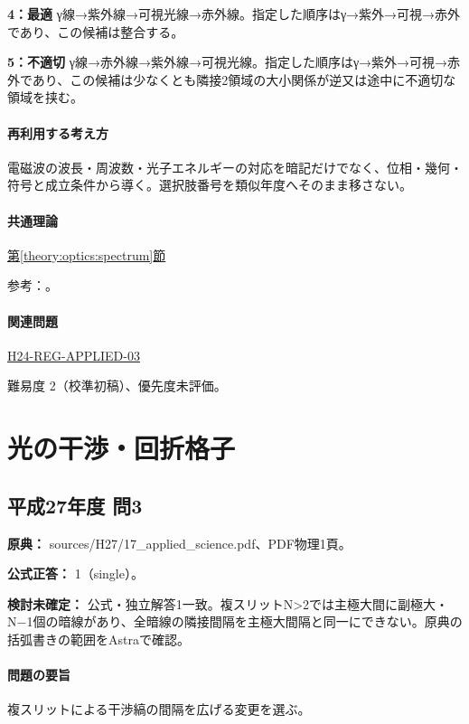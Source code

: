 \noindent\textbf{4：最適} γ線→紫外線→可視光線→赤外線。指定した順序はγ→紫外→可視→赤外であり、この候補は整合する。\par

\noindent\textbf{5：不適切} γ線→赤外線→紫外線→可視光線。指定した順序はγ→紫外→可視→赤外であり、この候補は少なくとも隣接2領域の大小関係が逆又は途中に不適切な領域を挟む。\par

\paragraph{再利用する考え方} 電磁波の波長・周波数・光子エネルギーの対応を暗記だけでなく、位相・幾何・符号と成立条件から導く。選択肢番号を類似年度へそのまま移さない。

\paragraph{共通理論} \hyperref[theory:optics:spectrum]{第\ref*{theory:optics:spectrum}節}

\par 参考：\cite{os_spectrum}。

\paragraph{関連問題} \hyperref[q:h24-reg-applied-03]{H24-REG-APPLIED-03}

\par 難易度 2（校準初稿）、優先度未評価。

\section{光の干渉・回折格子}

\subsection{平成27年度 問3}
\label{q:h27-reg-applied-03}

\noindent\textbf{原典：} sources/H27/17\_applied\_science.pdf、PDF物理1頁。

\textbf{公式正答：} 1（single）。

\par\textbf{検討未確定：} 公式・独立解答1一致。複スリットN>2では主極大間に副極大・N−1個の暗線があり、全暗線の隣接間隔を主極大間隔と同一にできない。原典の括弧書きの範囲をAstraで確認。

\paragraph{問題の要旨} 複スリットによる干渉縞の間隔を広げる変更を選ぶ。

